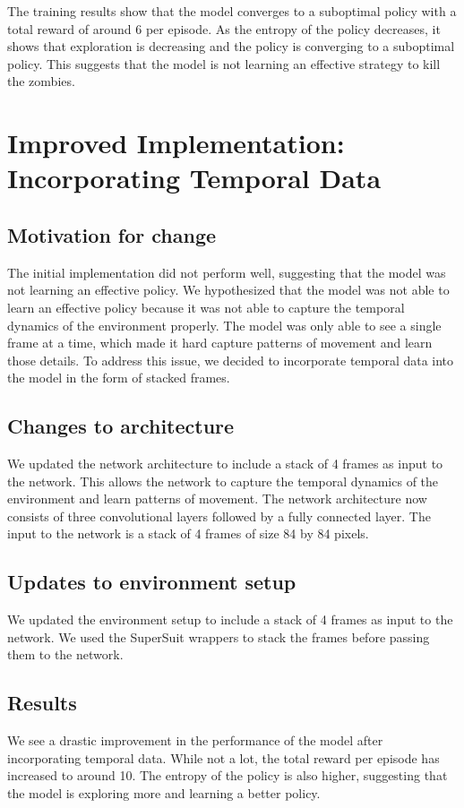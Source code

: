 \documentclass{article}
\begin{document}
The training results show that the model converges to a suboptimal policy with a total reward of around 6 per episode. As the entropy 
of the policy decreases, it shows that exploration is decreasing and the policy is converging to a suboptimal policy. This suggests that the model is not learning
an effective strategy to kill the zombies.

\section{Improved Implementation: Incorporating Temporal Data}
\subsection{Motivation for change}
The initial implementation did not perform well, suggesting that the model was not learning an effective policy. We hypothesized that the model
was not able to learn an effective policy because it was not able to capture the temporal dynamics of the environment properly. The model was only able to see
a single frame at a time, which made it hard capture patterns of movement and learn those details. 
To address this issue, we decided to incorporate temporal data into the model in the form of stacked frames.

\subsection{Changes to architecture}
We updated the network architecture to include a stack of 4 frames as input to the network. This allows the network to capture the temporal dynamics of the environment
and learn patterns of movement. The network architecture now consists of three convolutional layers followed by a fully connected layer. The input to the network is a stack of 4 frames
of size 84 by 84 pixels.

\subsection{Updates to environment setup}
We updated the environment setup to include a stack of 4 frames as input to the network. We used the SuperSuit wrappers to stack the frames before passing them to the network.

\subsection{Results}
We see a drastic improvement in the performance of the model after incorporating temporal data. 
While not a lot, the total reward per episode has increased to around 10. The entropy of the policy is also higher, suggesting that the model is exploring more and learning a better policy.
\end{document}
